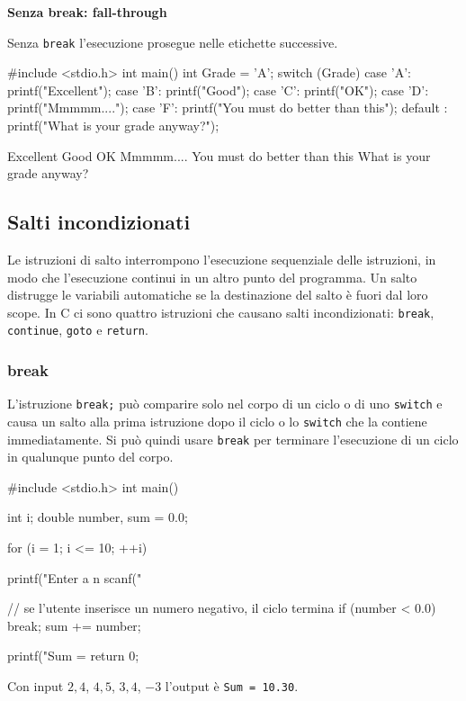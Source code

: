 \documentclass[11pt,a4paper]{article}
\begin{document}
\medskip\noindent\textbf{Senza break: fall-through}\par\nopagebreak

Senza \lstinline|break| l'esecuzione prosegue nelle etichette successive.
\begin{esempio}
\begin{codice}
#include <stdio.h>
int main()
{
    int Grade = 'A';
    switch (Grade)
    {
        case 'A': printf("Excellent\n");
        case 'B': printf("Good\n");
        case 'C': printf("OK\n");
        case 'D': printf("Mmmmm....\n");
        case 'F': printf("You must do better than this\n");
        default : printf("What is your grade anyway?\n");
    }
}
\end{codice}
\begin{risultato}
Excellent
Good
OK
Mmmmm....
You must do better than this
What is your grade anyway?
\end{risultato}
\end{esempio}

\subsection{Salti incondizionati}

Le istruzioni di salto interrompono l'esecuzione sequenziale delle istruzioni, in modo che l'esecuzione continui in un altro punto del programma. Un salto distrugge le variabili automatiche se la destinazione del salto è fuori dal loro scope. In C ci sono quattro istruzioni che causano salti incondizionati: \lstinline|break|, \lstinline|continue|, \lstinline|goto| e \lstinline|return|.

\subsubsection{break}

L'istruzione \lstinline|break;| può comparire solo nel corpo di un ciclo o di uno \lstinline|switch| e causa un salto alla prima istruzione dopo il ciclo o lo \lstinline|switch| che la contiene immediatamente. Si può quindi usare \lstinline|break| per terminare l'esecuzione di un ciclo in qualunque punto del corpo.

\begin{esempio}
\begin{codice}
#include <stdio.h>
int main()
{
    int i;
    double number, sum = 0.0;

    for (i = 1; i <= 10; ++i)
    {
        printf("Enter a n%
        scanf("%

        // se l'utente inserisce un numero negativo, il ciclo termina
        if (number < 0.0)
        {
            break;
        }
        sum += number;
    }
    printf("Sum = %
    return 0;
}
\end{codice}
Con input $2{,}4$, $4{,}5$, $3{,}4$, $-3$ l'output è \texttt{Sum = 10.30}.
\end{esempio}
\end{document}
